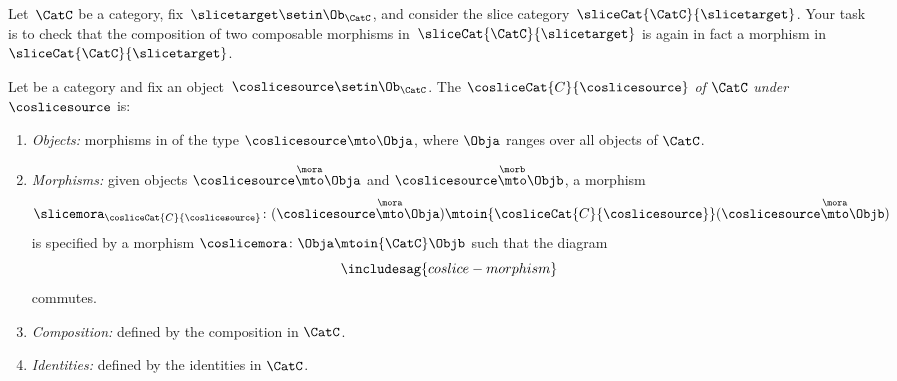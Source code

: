 \begin{gradedexercise}
    \label{ex:SliceCat}
    Let~$\CatC$ be a category, fix~$\slicetarget \setin \Ob_{\CatC}$, and consider the slice category~$\sliceCat{\CatC}{\slicetarget}$.
    Your task is to check that the composition of two composable morphisms in~$\sliceCat{\CatC}{\slicetarget}$ is again in fact a morphism in~$\sliceCat{\CatC}{\slicetarget}$.
\end{gradedexercise}


\begin{ctdefinition}
    \label{def:coslice-category}

    Let \CatC be a category and fix an object~$\coslicesource \setin \Ob_\CatC$.
    The  $\cosliceCat{C}{\coslicesource}$ \emph{of} $\CatC$ \emph{under} $\coslicesource$ is:
    \begin{enumerate}
        \item \emph{Objects:} morphisms in \CatC of the type $\coslicesource \mto \Obja$, where $\Obja$ ranges over all objects of $\CatC$.
        \item \emph{Morphisms:} given objects $\coslicesource \overset{\mora}{\mto} \Obja$ and $\coslicesource  \overset{\morb}{\mto} \Objb$, a morphism
              \begin{equation}
                  \slicemora_{\cosliceCat{C}{\coslicesource}} \colon (\coslicesource \overset{\mora}{\mto} \Obja)
                  \mtoin{\cosliceCat{C}{\coslicesource}}
                  (\coslicesource \overset{\mora}{\mto} \Objb)
              \end{equation}
              is specified by a morphism $\coslicemora \colon \Obja \mtoin{\CatC} \Objb$ such that the diagram
              \begin{equation}\label{eq:coslice-morphism}
                  \includesag{coslice-morphism}
              \end{equation}
              commutes.

        \item \emph{Composition:} defined by the composition in $\CatC$.
        \item \emph{Identities:} defined by the identities in $\CatC$.
    \end{enumerate}
\end{ctdefinition}

